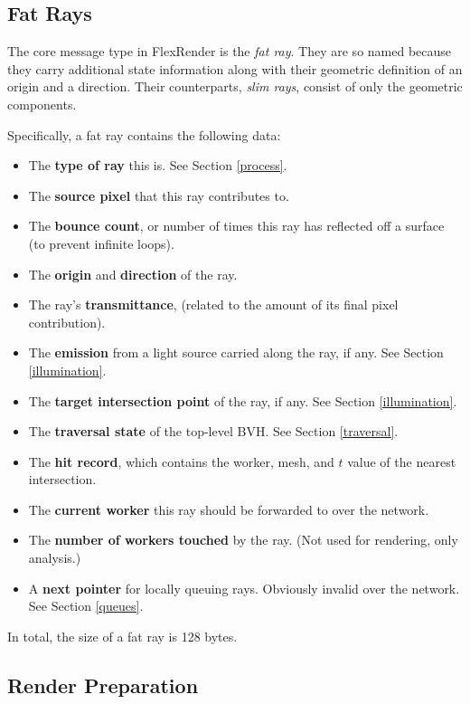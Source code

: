 \documentclass[a4paper,twoside]{article}
\begin{document}
\subsection{Fat Rays}
\label{fatrays}

The core message type in FlexRender is the \emph{fat ray}. They are so named
because they carry additional state information along with their geometric
definition of an origin and a direction. Their counterparts, \emph{slim rays},
consist of only the geometric components.

Specifically, a fat ray contains the following data:

\begin{itemize}
    \item The \textbf{type of ray} this is. See Section \ref{process}.
    \item The \textbf{source pixel} that this ray contributes to.
    \item The \textbf{bounce count}, or number of times this ray has reflected
        off a surface (to prevent infinite loops).
    \item The \textbf{origin} and \textbf{direction} of the ray.
    \item The ray's \textbf{transmittance}, (related to the amount of its final
        pixel contribution).
    \item The \textbf{emission} from a light source carried along the ray, if
        any. See Section \ref{illumination}.
    \item The \textbf{target intersection point} of the ray, if any. See
        Section \ref{illumination}.
    \item The \textbf{traversal state} of the top-level BVH. See Section \ref{traversal}.
    \item The \textbf{hit record}, which contains the worker, mesh, and $t$
        value of the nearest intersection.
    \item The \textbf{current worker} this ray should be forwarded to over the
        network.
    \item The \textbf{number of workers touched} by the ray. (Not
        used for rendering, only analysis.)
    \item A \textbf{next pointer} for locally queuing rays. Obviously invalid
        over the network. See Section \ref{queues}.
\end{itemize}

In total, the size of a fat ray is 128 bytes.

\subsection{Render Preparation}
\label{prep}
\end{document}

